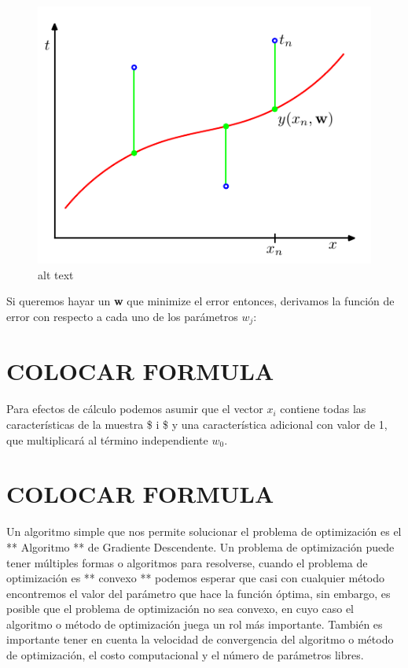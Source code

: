 \documentclass[11pt]{article}
\makeatletter
\def\maxwidth{\ifdim\Gin@nat@width>\linewidth\linewidth
    \else\Gin@nat@width\fi}
\let\Oldincludegraphics\includegraphics
\renewcommand{\includegraphics}[1]{\Oldincludegraphics[width=.8\maxwidth]{#1}}
\makeatother
\begin{document}
    \begin{figure}[htbp]
\centering
\includegraphics{./Images/Regression.png}
\caption{alt text}
\end{figure}

    Si queremos hayar un \textbf{w} que minimize el error entonces,
derivamos la función de error con respecto a cada uno de los parámetros
\({w}_{j}\):

\section{COLOCAR FORMULA}\label{colocar-formula}

Para efectos de cálculo podemos asumir que el vector \({x}_{i}\)
contiene todas las características de la muestra \$ i \$ y una
característica adicional con valor de 1, que multiplicará al término
independiente \({w}_{0}\).

\section{COLOCAR FORMULA}\label{colocar-formula-1}

Un algoritmo simple que nos permite solucionar el problema de
optimización es el ** Algoritmo ** de Gradiente Descendente. Un problema
de optimización puede tener múltiples formas o algoritmos para
resolverse, cuando el problema de optimización es ** convexo ** podemos
esperar que casi con cualquier método encontremos el valor del parámetro
que hace la función óptima, sin embargo, es posible que el problema de
optimización no sea convexo, en cuyo caso el algoritmo o método de
optimización juega un rol más importante. También es importante tener en
cuenta la velocidad de convergencia del algoritmo o método de
optimización, el costo computacional y el número de parámetros libres.
\end{document}
